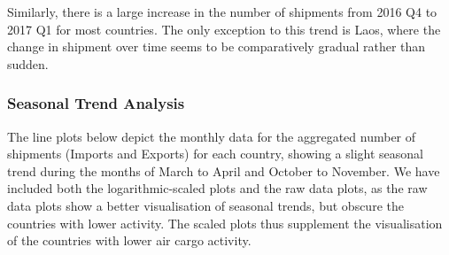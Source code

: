 \documentclass{article}
\begin{document}
\noindent Similarly, there is a large increase in the number of shipments from 2016 Q4 to 2017 Q1 for most countries. The only exception to this trend is Laos, where the change in shipment over time seems to be comparatively gradual rather than sudden.

\subsubsection{Seasonal Trend Analysis}
The line plots below depict the monthly data for the aggregated number of shipments (Imports and Exports) for each country, showing a slight seasonal trend during the months of March to April and October to November. We have included both the logarithmic-scaled plots and the raw data plots, as the raw data plots show a better visualisation of seasonal trends, but obscure the countries with lower activity. The scaled plots thus supplement the visualisation of the countries with lower air cargo activity.

\newpage
\end{document}
